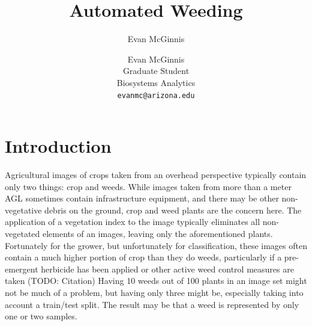 \documentclass[letterpaper]{article}
\author{Evan McGinnis}
\title{Automated Weeding}
\author{%
    Evan McGinnis \\
    Graduate Student \\
    Biosystems Analytics \\
    \texttt{evanmc@arizona.edu}\vspace{40pt} \\
    }
\makeatletter
\def\printauthor{%
    {\large \@author}}
\makeatother
\begin{document}
\restoregeometry
%
%
\tableofcontents
\listoffigures
\listoftables
\newpage

%



\section{Introduction}
Agricultural images of crops taken from an overhead perspective typically contain only two things: crop and weeds. While images taken from more than a meter AGL sometimes contain infrastructure equipment, and there may be other non-vegetative debris on the ground, crop and weed plants are the concern here. The application of a vegetation index to the image typically eliminates all non-vegetated elements of an images, leaving only the aforementioned plants. Fortunately for the grower, but unfortunately for classification, these images often contain a much higher portion of crop than they do weeds, particularly if a pre-emergent herbicide has been applied or other active weed control measures are taken (TODO: Citation) Having 10 weeds out of 100 plants in an image set might not be much of a problem, but having only three might be, especially taking into account a train/test split. The result may be that a weed is represented by only one or two samples.
\end{document}
